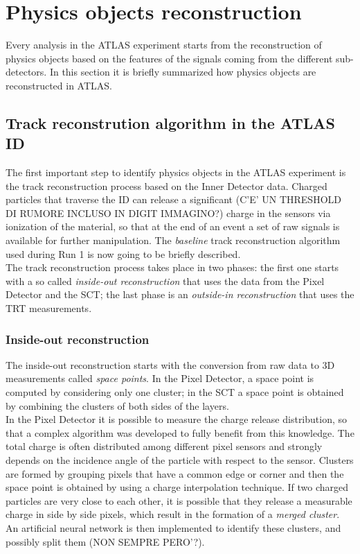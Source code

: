 \documentclass[a4paper,twoside,12pt]{article}
\begin{document}
\newpage

\section{Physics objects reconstruction}
Every analysis in the ATLAS experiment starts from the reconstruction of physics objects
based on the features of the signals coming from the different sub-detectors\cite{PhysicsObjectReconstruction}. In this section it is briefly
summarized how physics objects are reconstructed in ATLAS.\\

\subsection{Track reconstrution algorithm in the ATLAS ID}
The first important step to identify physics objects in the ATLAS experiment is the track reconstruction process based on the Inner Detector data. Charged particles that
traverse the ID can release a significant (C'E' UN THRESHOLD DI RUMORE INCLUSO IN DIGIT IMMAGINO?) charge in the sensors via ionization of the material, so that at the end of an event a set
of raw signals is available for further manipulation. The \textit{baseline} track reconstruction
algorithm used during Run 1 is now going to be briefly described\cite{OptimizationTrackReconstructionAlgorithm}.\\

The track reconstruction process takes place in two phases: the first one starts with a so called \textit{inside-out reconstruction} that uses the data from the Pixel Detector and the SCT; the last phase is an \textit{outside-in reconstruction} that uses the TRT measurements. \\

\subsubsection*{Inside-out reconstruction}
The inside-out reconstruction starts with the conversion from raw data to 3D measurements called \textit{space points}. In the Pixel Detector, a space point is computed by
considering only one cluster; in the SCT a space point
is obtained by combining the clusters of both sides of the layers.  \\

In the Pixel Detector it is
possible to measure the charge release distribution, so that a complex algorithm was developed
to fully benefit from this knowledge.  
The total charge is often distributed among different pixel sensors and strongly depends on the 
incidence angle of the particle with respect to the sensor. Clusters are formed by grouping 
pixels that have a common edge or corner and then the space point is obtained by using a 
charge interpolation technique. If two charged particles are very close to each other, it is possible
that they release a measurable charge in side by side pixels, which result in the formation of
a \textit{merged cluster}. An artificial neural network is then implemented to identify these clusters, and possibly split them (NON SEMPRE PERO'?).\\
\end{document}
